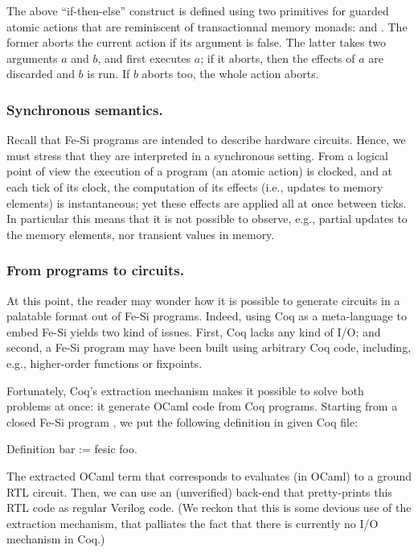 \documentclass{llncs}
\begin{document}
The above ``if-then-else'' construct is defined using two primitives
for guarded atomic actions that are reminiscent of transactionnal
memory monads:  and . The former aborts the
current action if its argument is false.
%
The latter takes two arguments $a$ and $b$, and first executes $a$; if
it aborts, then the effects of $a$ are discarded and $b$ is run. If
$b$ aborts too, the whole action  aborts.

\subsubsection{Synchronous semantics.} Recall that Fe-Si programs are
intended to describe hardware circuits. Hence, we must stress that
they are interpreted in a synchronous setting.
%
From a logical point of view the execution of a program (an atomic
action) is clocked, and at each tick of its clock, the computation of
its effects (i.e., updates to memory elements) is instantaneous; 
yet these effects are applied all at once between ticks. 
%
In particular this means that it is not possible to observe, e.g.,
partial updates to the memory elements, nor transient values in
memory.

\subsubsection{From programs to circuits.} At this point, the reader may
wonder how it is possible to generate circuits in a palatable format
out of Fe-Si programs. Indeed, using Coq as a meta-language to embed
Fe-Si yields two kind of issues. First, Coq lacks any kind of I/O; and
second, a Fe-Si program may have been built using arbitrary Coq code,
including, e.g., higher-order functions or fixpoints.

Fortunately, Coq's extraction mechanism makes it possible to solve
both problems at once: it generate OCaml code from Coq
programs. Starting from a closed Fe-Si program , we put the
following definition in given Coq file: 
\begin{coq}
Definition bar := fesic foo.  
\end{coq}
The extracted OCaml term that corresponds to  evaluates (in OCaml) to a
ground RTL circuit. Then, we can use an (unverified) back-end that
pretty-prints this RTL code as regular Verilog code. 
%
(We reckon that this is some devious use of the extraction mechanism,
that palliates the fact that there is currently no I/O mechanism in
Coq.)
\end{document}
